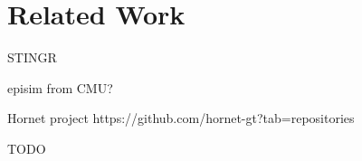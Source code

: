 \section{Related Work}

STINGR

episim from CMU?

Hornet project https://github.com/hornet-gt?tab=repositories

TODO
